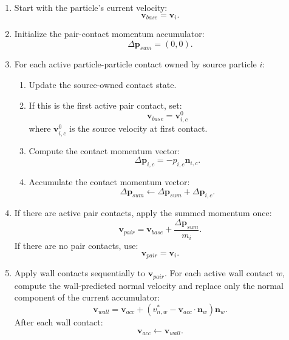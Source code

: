 \begin{enumerate}
    \item Start with the particle's current velocity:
    \[
        \mathbf{v}_{base} = \mathbf{v}_i .
    \]

    \item Initialize the pair-contact momentum accumulator:
    \[
        \Delta \mathbf{p}_{sum} = (0,0).
    \]

    \item For each active particle-particle contact owned by source particle
    \(i\):
    \begin{enumerate}
        \item Update the source-owned contact state.

        \item If this is the first active pair contact, set:
        \[
            \mathbf{v}_{base} = \mathbf{v}_{i,c}^{0}
        \]
        where \(\mathbf{v}_{i,c}^{0}\) is the source velocity at first contact.

        \item Compute the contact momentum vector:
        \[
            \Delta \mathbf{p}_{i,c}
            =
            -p_{i,c}\mathbf{n}_{i,c}.
        \]

        \item Accumulate the contact momentum vector:
        \[
            \Delta \mathbf{p}_{sum}
            \leftarrow
            \Delta \mathbf{p}_{sum}
            +
            \Delta \mathbf{p}_{i,c}.
        \]
    \end{enumerate}

    \item If there are active pair contacts, apply the summed momentum once:
    \[
        \mathbf{v}_{pair}
        =
        \mathbf{v}_{base}
        +
        \frac{\Delta \mathbf{p}_{sum}}{m_i}.
    \]
    If there are no pair contacts, use:
    \[
        \mathbf{v}_{pair} = \mathbf{v}_i .
    \]

    \item Apply wall contacts sequentially to \(\mathbf{v}_{pair}\). For each
    active wall contact \(w\), compute the wall-predicted normal velocity and
    replace only the normal component of the current accumulator:
    \[
        \mathbf{v}_{wall}
        =
        \mathbf{v}_{acc}
        +
        \left(
            v_{n,w}^{\ast}
            -
            \mathbf{v}_{acc}\cdot\mathbf{n}_w
        \right)
        \mathbf{n}_w .
    \]
    After each wall contact:
    \[
        \mathbf{v}_{acc} \leftarrow \mathbf{v}_{wall}.
    \]


\end{enumerate}
